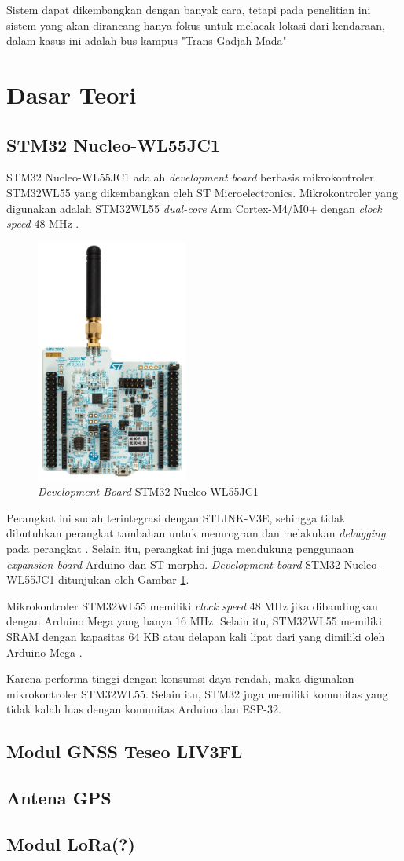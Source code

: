 Sistem dapat dikembangkan dengan banyak cara, tetapi pada penelitian ini sistem yang akan dirancang hanya fokus untuk melacak lokasi dari kendaraan, dalam kasus ini adalah bus kampus "Trans Gadjah Mada"

\section{Dasar Teori}
\subsection{STM32 Nucleo-WL55JC1}
STM32 Nucleo-WL55JC1 adalah \textit{development board} berbasis mikrokontroler STM32WL55 yang  dikembangkan oleh ST Microelectronics. Mikrokontroler yang digunakan adalah STM32WL55  \textit{dual-core }Arm Cortex-M4/M0+ dengan \textit{clock speed} 48 MHz \cite{STMicroelectronics2022a}.

\begin{figure}[ht]
	\centering
	\includegraphics[width=5cm]{contents/chapter-2/stm32-wl55jc1.jpg}
	\caption{\textit{Development Board} STM32 Nucleo-WL55JC1}
	\label{Fig: STM32 Nucleo-WL55JC1}
\end{figure}

Perangkat ini sudah terintegrasi dengan STLINK-V3E, sehingga tidak dibutuhkan perangkat tambahan untuk memrogram dan melakukan \textit{debugging} pada perangkat \cite{STMicroelectronics2022}. Selain itu, perangkat ini juga mendukung penggunaan \textit{expansion board} Arduino dan ST morpho. \textit{Development board} STM32 Nucleo-WL55JC1 ditunjukan oleh Gambar \ref{Fig: STM32 Nucleo-WL55JC1}.

Mikrokontroler STM32WL55 memiliki \textit{clock speed} 48 MHz jika dibandingkan dengan Arduino Mega yang hanya 16 MHz. Selain itu, STM32WL55 memiliki SRAM dengan kapasitas 64 KB atau delapan kali lipat dari yang dimiliki oleh Arduino Mega \cite{STMicroelectronics2022b}.

Karena performa tinggi dengan konsumsi daya rendah, maka digunakan mikrokontroler STM32WL55. Selain itu, STM32 juga memiliki komunitas yang tidak kalah luas dengan komunitas Arduino dan ESP-32.

\subsection{Modul GNSS Teseo LIV3FL}
\subsection{Antena GPS }
\subsection{Modul LoRa(?)}